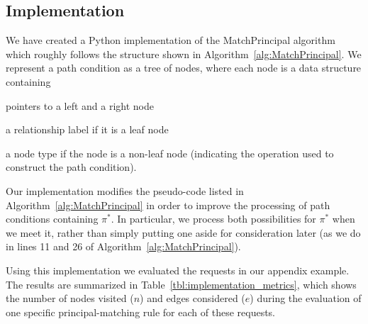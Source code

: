 \documentclass{article}
\begin{document}
\subsection{Implementation}
We have created a Python implementation of the \textsf{MatchPrincipal} algorithm which roughly follows the structure shown in Algorithm~\ref{alg:MatchPrincipal}.
We represent a path condition as a tree of nodes, where each node is a data structure containing
\begin{inparaenum}[(i)]
  \item pointers to a left and a right node
  \item a relationship label if it is a leaf node
  \item a node type if the node is a non-leaf node (indicating the operation used to construct the path condition).
\end{inparaenum}
Our implementation modifies the pseudo-code listed in Algorithm~\ref{alg:MatchPrincipal} in order to improve the processing of path conditions containing $\pi^*$.
In particular, we process both possibilities for $\pi^*$ when we meet it, rather than simply putting one aside for consideration later (as we do in lines 11 and 26 of Algorithm~\ref{alg:MatchPrincipal}).


Using this implementation we evaluated the requests in our appendix example.
The results are summarized in Table~\ref{tbl:implementation_metrics}, which shows the number of nodes visited ($n$) and edges considered ($e$) during the evaluation of one specific principal-matching rule for each of these requests.
\end{document}
